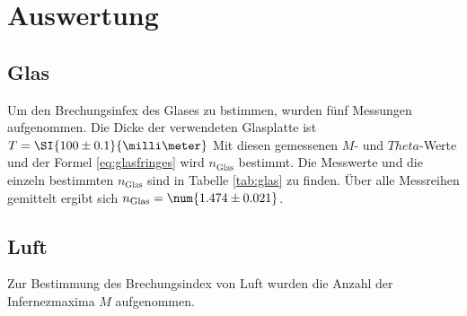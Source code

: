 \section{Auswertung}
\label{sec:Auswertung}
\subsection{Glas}
Um den Brechungsinfex des Glases zu bstimmen, wurden fünf Messungen aufgenommen. Die Dicke der verwendeten Glasplatte ist $T=\SI{100\pm 0.1}{\milli\meter}$
Mit diesen gemessenen $M$- und $Theta$-Werte und der Formel \eqref{eq:glasfringes} wird $n_\text{Glas}$ bestimmt. Die Messwerte und die einzeln bestimmten
 $n_\text{Glas}$ sind in Tabelle \ref{tab:glas} zu finden.
Über alle Messreihen gemittelt ergibt sich $n_\text{Glas}=\num{1.474\pm 0.021}$.

\subsection{Luft}
Zur Bestimmung des Brechungsindex von Luft wurden die Anzahl der Infernezmaxima $M$ aufgenommen.

